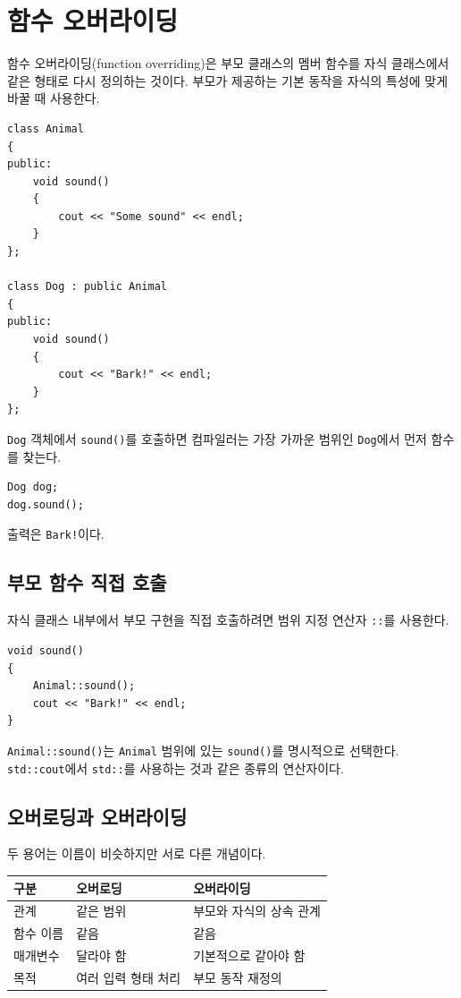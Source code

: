 \documentclass[11pt,a4paper]{article}
\begin{document}
\section{함수 오버라이딩}
함수 오버라이딩(function overriding)은 부모 클래스의 멤버 함수를 자식 클래스에서 같은 형태로 다시 정의하는 것이다. 부모가 제공하는 기본 동작을 자식의 특성에 맞게 바꿀 때 사용한다.

\begin{lstlisting}
class Animal
{
public:
    void sound()
    {
        cout << "Some sound" << endl;
    }
};

class Dog : public Animal
{
public:
    void sound()
    {
        cout << "Bark!" << endl;
    }
};
\end{lstlisting}

\texttt{Dog} 객체에서 \texttt{sound()}를 호출하면 컴파일러는 가장 가까운 범위인 \texttt{Dog}에서 먼저 함수를 찾는다.

\begin{lstlisting}
Dog dog;
dog.sound();
\end{lstlisting}

출력은 \texttt{Bark!}이다.

\subsection{부모 함수 직접 호출}
자식 클래스 내부에서 부모 구현을 직접 호출하려면 범위 지정 연산자 \texttt{::}를 사용한다.

\begin{lstlisting}
void sound()
{
    Animal::sound();
    cout << "Bark!" << endl;
}
\end{lstlisting}

\texttt{Animal::sound()}는 \texttt{Animal} 범위에 있는 \texttt{sound()}를 명시적으로 선택한다. \texttt{std::cout}에서 \texttt{std::}를 사용하는 것과 같은 종류의 연산자이다.

\subsection{오버로딩과 오버라이딩}
두 용어는 이름이 비슷하지만 서로 다른 개념이다.

\begin{center}
\begin{tabular}{lll}
\toprule
구분 & 오버로딩 & 오버라이딩 \\
\midrule
관계 & 같은 범위 & 부모와 자식의 상속 관계 \\
함수 이름 & 같음 & 같음 \\
매개변수 & 달라야 함 & 기본적으로 같아야 함 \\
목적 & 여러 입력 형태 처리 & 부모 동작 재정의 \\
\bottomrule
\end{tabular}
\end{center}
\end{document}
